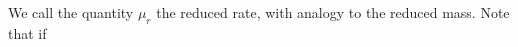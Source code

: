 We call the quantity \(\mu_r\) the reduced rate, with analogy to the reduced mass.  Note that if \(\)